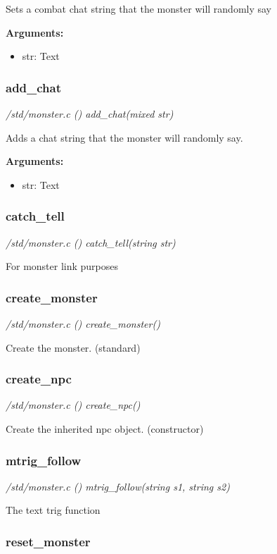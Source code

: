 Sets a combat chat string that the monster will randomly say

{\bf Arguments:}
\begin{itemize}
\item     str: Text
\end{itemize}


\subsubsection{add\_chat}

{\em /std/monster.c () add\_chat(mixed str)}

Adds a chat string that the monster will randomly say.

{\bf Arguments:}
\begin{itemize}
\item     str: Text
\end{itemize}


\subsubsection{catch\_tell}

{\em /std/monster.c () catch\_tell(string str)}

For monster link purposes


\subsubsection{create\_monster}

{\em /std/monster.c () create\_monster()}

Create the monster. (standard)


\subsubsection{create\_npc}

{\em /std/monster.c () create\_npc()}

Create the inherited npc object. (constructor)


\subsubsection{mtrig\_follow}

{\em /std/monster.c () mtrig\_follow(string s1, string s2)}

The text trig function


\subsubsection{reset\_monster}

